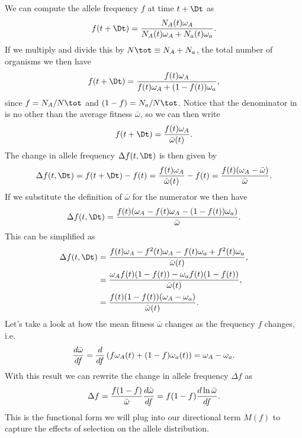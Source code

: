 We can compute the allele frequency $f$ at time $t + \Dt$ as
\begin{equation}
  f(t + \Dt) = {N_A(t) \omega_A \over N_A(t) \omega_A + N_a(t) \omega_a}.
\end{equation}
If we multiply and divide this by $N\tot \equiv N_A + N_a$, the total number of
organisms we then have
\begin{equation}
  f(t + \Dt) = {f(t) \omega_A \over f(t) \omega_A + (1 - f(t)) \omega_a},
  \label{eq_f_tdt}
\end{equation}
since $f = N_A/N\tot$ and $(1 - f) = N_a/N\tot$. Notice that the denominator in
 is no other than the average fitness $\bar{\omega}$, so we can
then write
\begin{equation}
  f(t + \Dt) = {f(t) \omega_A \over \bar{\omega}(t)}.
\end{equation}
The change in allele frequency $\Delta f(t, \Dt)$ is then given by
\begin{equation}
  \Delta f(t, \Dt) = f(t + \Dt) - f(t) = {f(t) \omega_A \over \bar{\omega}(t)}
  - f(t) = {f(t) (\omega_A - \bar{\omega}) \over \bar{\omega}}.
\end{equation}
If we substitute the definition of $\bar{\omega}$ for the numerator we then
have
\begin{equation}
  \Delta f(t, \Dt) = {f(t) (\omega_A - f(t) \omega_A -
  (1 - f(t)) \omega_a) \over
  \bar{\omega}}.
\end{equation}
This can be simplified as
\begin{align}
  \Delta f(t, \Dt) &= {f(t) \omega_A - f^2(t)\omega_A
  - f(t) \omega_a + f^2(t) \omega_a \over \bar{\omega}(t)}, \\
  &= {\omega_A f(t)(1 - f(t)) - \omega_a f(t) (1 - f(t)) \over
  \bar{\omega}(t)}, \\
  &= {f(t)(1 - f(t))(\omega_A - \omega_a) \over \bar{\omega}(t)}.
\end{align}
Let's take a look at how the mean fitness $\bar{\omega}$ changes as the
frequency $f$ changes, i.e.
\begin{equation}
  {d \bar{\omega} \over df} = {d \over df }
  \left(f \omega_A(t) + (1 - f) \omega_a(t)  \right) =
  \omega_A - \omega_a.
\end{equation}
With this result we can rewrite the change in allele frequency $\Delta f$ as
\begin{equation}
  \Delta f = {f (1 - f) \over \bar{\omega}} {d \bar{\omega} \over df} =
  f (1 - f) {d \ln \bar{\omega} \over df}.
\end{equation}
This is the functional form we will plug into our directional term $M(f)$ to
capture the effects of selection on the allele distribution.

